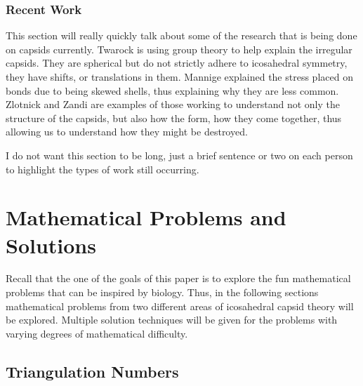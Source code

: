 \documentclass[12pt,letter]{article}
\begin{document}
\subsubsection{Recent Work}
This section will really quickly talk about some of the research that is being done on capsids currently. Twarock \cite{Twarock:2004} \cite{Twarock:2006} is using group theory to help explain the irregular capsids. They are spherical but do not strictly adhere to icosahedral symmetry, they have shifts, or translations in them. Mannige \cite{Mannige:2009} explained the stress placed on bonds due to being skewed shells, thus explaining why they are less common. Zlotnick \cite{Zlotnick:2005} and Zandi \cite{Zandi:2004} are examples of those working to understand not only the structure of the capsids, but also how the form, how they come together, thus allowing us to understand how they might be destroyed.

I do not want this section to be long, just a brief sentence or two on each person to highlight the types of work still occurring.

\section{Mathematical Problems and Solutions} %
Recall that the one of the goals of this paper is to explore the fun mathematical problems that can be inspired by biology. Thus, in the following sections mathematical problems from two different areas of icosahedral capsid theory will be explored. Multiple solution techniques will be given for the problems with varying degrees of mathematical difficulty.

\subsection{Triangulation Numbers} %
\end{document}
